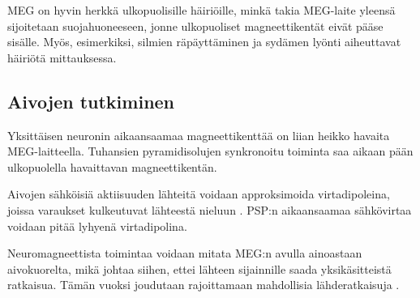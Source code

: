 MEG on hyvin herkkä ulkopuolisille häiriöille, minkä takia MEG-laite yleensä sijoitetaan suojahuoneeseen, jonne ulkopuoliset magneettikentät eivät pääse sisälle. Myös, esimerkiksi, silmien räpäyttäminen ja sydämen lyönti aiheuttavat häiriötä mittauksessa. \citep{Hamalainen1993MagnetoencephalographytheoryBrain}

\subsection{Aivojen tutkiminen}

Yksittäisen neuronin  aikaansaamaa magneettikenttää on liian heikko havaita MEG-laitteella. Tuhansien pyramidisolujen synkronoitu toiminta saa aikaan pään ulkopuolella havaittavan magneettikentän. \citep{He2018ElectrophysiologicalDynamics}

Aivojen sähköisiä aktiisuuden lähteitä voidaan approksimoida virtadipoleina, joissa varaukset kulkeutuvat lähteestä nieluun \citep[s. 6]{HariMEGprimer}. PSP:n aikaansaamaa sähkövirtaa voidaan pitää lyhyenä virtadipolina. \citep{He2018ElectrophysiologicalDynamics}

Neuromagneettista toimintaa voidaan mitata MEG:n avulla ainoastaan aivokuorelta, mikä johtaa siihen, ettei lähteen sijainnille saada yksikäsitteistä ratkaisua. Tämän vuoksi joudutaan rajoittamaan mahdollisia lähderatkaisuja \citep[s. 2]{hansen2010meg}.

